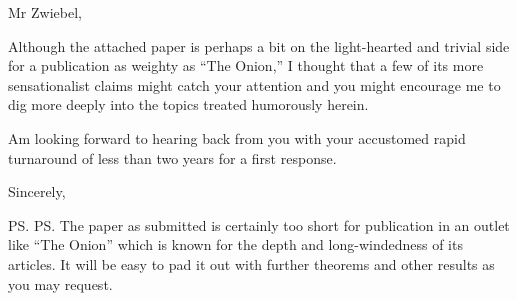\documentclass[12pt]{letter}
\begin{document}
Mr Zwiebel,

Although the attached paper is perhaps a bit on the light-hearted and trivial side for a publication as
weighty as ``The Onion,'' I thought that a few of its more sensationalist claims might catch your attention
and you might encourage me to dig more deeply into the topics treated humorously herein.

Am looking forward to hearing back from you with your accustomed rapid turnaround of less than two years
for a first response.

\closing{Sincerely,}

\ps{PS. The paper as submitted is certainly too short for publication in an outlet like ``The Onion'' which is known for
  the depth and long-windedness of its articles.  It will be easy to pad it out with further theorems and other results
as you may request.}
\end{document}

